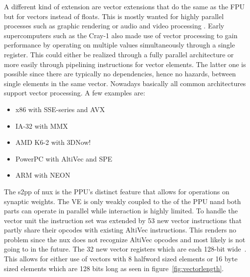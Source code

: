 A different kind of extension are vector extensions that do the same as the FPU but for vectors instead of floats.
This is mostly wanted for highly parallel processes such as graphic rendering or audio and video processing .
Early supercomputers such as the Cray-1  also made use of vector processing to gain performance by operating on multiple values  simultaneously through a single register.
This could either be realized through a fully parallel architecture or more easily through pipelining instructions for vector elements.
The latter one is possible since there are typically no dependencies, hence no hazards, between single elements in the same vector.
Nowadays basically all common architectures support vector processing.
A few examples are:

\noindent\begin{minipage}[t]{\textwidth}
    \vspace{1em}
    \begin{minipage}[t]{0.4\textwidth}
\begin{itemize}
    \item x86 with SSE-series and AVX
    \item IA-32 with MMX
    \item AMD K6-2 with 3DNow!
\end{itemize}
\end{minipage}
\begin{minipage}[t]{0.6\textwidth}
\begin{itemize}
    \item PowerPC with AltiVec and SPE
    \item ARM with NEON
\end{itemize}
\end{minipage}
    \vspace{1em}
\end{minipage}

The s2pp  of nux is the \ac{PPU}'s distinct feature that allows for  operations on synaptic weights.
The \ac{VE} is only weakly coupled to the  of the \ac{PPU} nand both parts can operate in parallel while interaction is highly limited.
To handle the vector unit the instruction set was extended by 53 new vector instructions that partly share their opcodes with existing AltiVec instructions.
This renders no problem since the nux does not recognize AltiVec opcodes and most likely is not going to in the future.
The  32 new vector registers which are each 128-bit wide~\citep{AV:registers}.
This allows for either use of vectors with 8 halfword sized elements or 16 byte sized elements which are 128 bits long as seen in figure~\ref{fig:vectorlength}.

